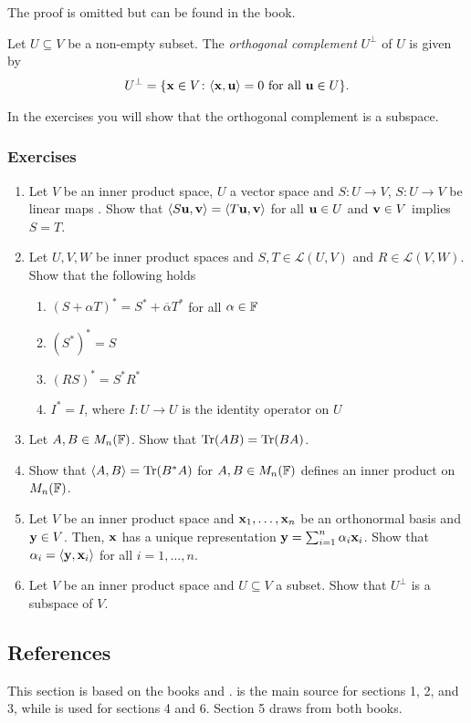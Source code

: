 \documentclass{article}
\begin{document}
The proof is omitted but can be found in the book.

\begin{definition}
Let $U\subseteq V$ be a non-empty subset. The \emph{orthogonal complement} $U^\perp$ of $U$ is given by
\begin{align*}
    U^\perp = \{ {\mathbf{x}} \in V \colon \langle {\mathbf{x}},{\mathbf{u}} \rangle = 0 \text{ for all } {\mathbf{u}} \in U\}.
\end{align*}
\end{definition}

In the exercises you will show that the orthogonal complement is a subspace. 

\subsubsection{Exercises}

\begin{enumerate}
    \item Let $V$ be an inner product space, $U$ a vector space and $S\colon U \to V$, $S\colon U \to V$ be linear maps . Show that $\langle S{\mathbf{u}},{\mathbf{v}} \rangle= \langle T{\mathbf{u}}, {\mathbf{v}} \rangle$ for all ${\mathbf{u}} \in U$ and ${\mathbf{v}} \in V$ implies $S=T$.
    \item Let $U,V,W$ be inner product spaces and $S,T \in \mathcal{L}(U,V)$ and $R\in \mathcal{L}(V,W)$. Show that the following holds
\begin{enumerate}
    \item $(S+\alpha T)^* = S^* + \overline{\alpha}T^*$ for all $\alpha\in {\mathbb{F}}$
    \item $(S^*)^* = S$
    \item $(RS)^* = S^*R^*$
    \item $I^* = I$, where $I \colon U \to U$ is the identity operator on $U$
\end{enumerate}
    \item Let $A,B \in M_n({\mathbb{F}})$. Show that $\mathrm{Tr}(AB) = \mathrm{Tr}(BA)$.
    \item Show that $\langle A,B \rangle = \mathrm{Tr}(B^*A)$ for $A,B \in M_n({\mathbb{F}})$ defines an inner product on $M_n({\mathbb{F}})$.
    \item Let $V$ be an inner product space and ${\mathbf{x}}_1,\ldots, {\mathbf{x}}_n$ be an orthonormal basis and ${\mathbf{y}} \in V$. Then, ${\mathbf{x}}$ has a unique representation ${\mathbf{y}} =\sum_{i=1}^n \alpha_i {\mathbf{x}}_i$. Show that $\alpha_i = \langle {\mathbf{y}},{\mathbf{x}}_i \rangle$ for all $i= 1,\ldots, n$.
    \item Let $V$ be an inner product space and $U\subseteq V$ a subset. Show that $U^\perp$ is a subspace of $V$.
\end{enumerate}

\subsection{References}
This section is based on the books \cite{linalgright} and \cite{linalgwrong}. \cite{linalgright} is the main source for sections 1, 2, and 3, while \cite{linalgwrong} is used for sections 4 and 6. Section 5 draws from both books.



\newpage

 

\end{document}
